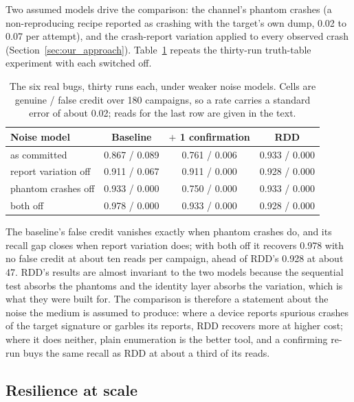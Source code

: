 Two assumed models drive the comparison: the channel's phantom crashes (a
non-reproducing recipe reported as crashing with the target's own dump, 0.02 to
0.07 per attempt), and the crash-report variation applied to every observed crash
(Section~\ref{sec:our_approach}). Table~\ref{tab:noise} repeats the thirty-run
truth-table experiment with each switched off.

\begin{table}[!t]
\renewcommand{\arraystretch}{1.2}
\caption{The six real bugs, thirty runs each, under weaker noise models. Cells are
genuine / false credit over 180 campaigns, so a rate carries a standard error of
about 0.02; reads for the last row are given in the text.}
\label{tab:noise}
\centering
\footnotesize
\setlength{\tabcolsep}{3pt}%
\begin{tabular}{@{}lccc@{}}
\toprule
Noise model & Baseline & $+$ 1 confirmation & RDD\\
\midrule
as committed            & 0.867 / 0.089 & 0.761 / 0.006 & 0.933 / 0.000\\
report variation off    & 0.911 / 0.067 & 0.911 / 0.000 & 0.928 / 0.000\\
phantom crashes off     & 0.933 / 0.000 & 0.750 / 0.000 & 0.933 / 0.000\\
both off                & 0.978 / 0.000 & 0.933 / 0.000 & 0.928 / 0.000\\
\bottomrule
\end{tabular}
\end{table}

The baseline's false credit vanishes exactly when phantom crashes do, and its
recall gap closes when report variation does; with both off it recovers 0.978
with no false credit at about ten reads per campaign, ahead of RDD's 0.928 at
about 47. RDD's results are almost invariant to the two models because the
sequential test absorbs the phantoms and the identity layer absorbs the
variation, which is what they were built for. The comparison is therefore a
statement about the noise the medium is assumed to produce: where a device
reports spurious crashes of the target signature or garbles its reports, RDD
recovers more at higher cost; where it does neither, plain enumeration is the better tool, and a confirming re-run
buys the same recall as RDD at about a third of its reads.

\subsection{Resilience at scale}\label{ssec:eval-scale}

